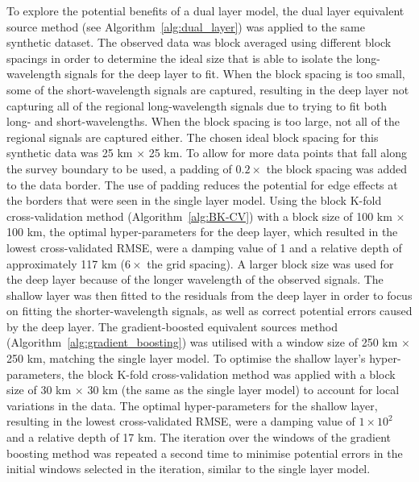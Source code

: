 To explore the potential benefits of a dual layer model, the dual layer equivalent source method (see Algorithm~\ref{alg:dual_layer}) was applied to the same synthetic dataset. The observed data was block averaged using different block spacings in order to determine the ideal size that is able to isolate the long-wavelength signals for the deep layer to fit. When the block spacing is too small, some of the short-wavelength signals are captured, resulting in the deep layer not capturing all of the regional long-wavelength signals due to trying to fit both long- and short-wavelengths. When the block spacing is too large, not all of the regional signals are captured either. The chosen ideal block spacing for this synthetic data was 25 km $\times$ 25 km. To allow for more data points that fall along the survey boundary to be used, a padding of $0.2 \times $ the block spacing was added to the data border. The use of padding reduces the potential for edge effects at the borders that were seen in the single layer model. Using the block K-fold cross-validation method (Algorithm~\ref{alg:BK-CV}) with a block size of 100 km $\times$ 100 km, the optimal hyper-parameters for the deep layer, which resulted in the lowest cross-validated RMSE, were a damping value of 1 and a relative depth of approximately 117 km ($6 \times$ the grid spacing). A larger block size was used for the deep layer because of the longer wavelength of the observed signals. The shallow layer was then fitted to the residuals from the deep layer in order to focus on fitting the shorter-wavelength signals, as well as correct potential errors caused by the deep layer. The gradient-boosted equivalent sources method (Algorithm~\ref{alg:gradient_boosting}) was utilised with a window size of 250 km $\times$ 250 km, matching the single layer model. To optimise the shallow layer’s hyper-parameters, the block K-fold cross-validation method was applied with a block size of 30 km $\times$ 30 km (the same as the single layer model) to account for local variations in the data. The optimal hyper-parameters for the shallow layer, resulting in the lowest cross-validated RMSE, were a damping value of $1 \times 10^{2}$ and a relative depth of 17 km. The iteration over the windows of the gradient boosting method was repeated a second time to minimise potential errors in the initial windows selected in the iteration, similar to the single layer model.

